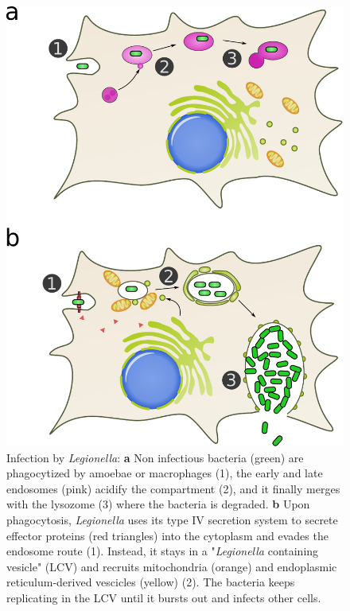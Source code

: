 \begin{figure}[b]
    \includegraphics[width=\textwidth]{Parts/Part01/gfx/legionella_life_cycle.pdf}
    \caption[Infection by \textit{Legionella}.]{Infection by \textit{Legionella}: \textbf{a} Non infectious bacteria (green) are phagocytized by amoebae or macrophages (1), the early and late endosomes (pink) acidify the compartment (2), and it finally merges with the lysozome (3) where the bacteria is degraded. \textbf{b} Upon phagocytosis, \textit{Legionella} uses its type IV secretion system to secrete effector proteins (red triangles) into the cytoplasm and evades the endosome route (1). Instead, it stays in a "\textit{Legionella} containing vesicle" (LCV) and recruits mitochondria (orange) and endoplasmic reticulum-derived vescicles (yellow) (2). The bacteria keeps replicating in the LCV until it bursts out and infects other cells.}
	\label{fig:01-01:legionella}
\end{figure}

